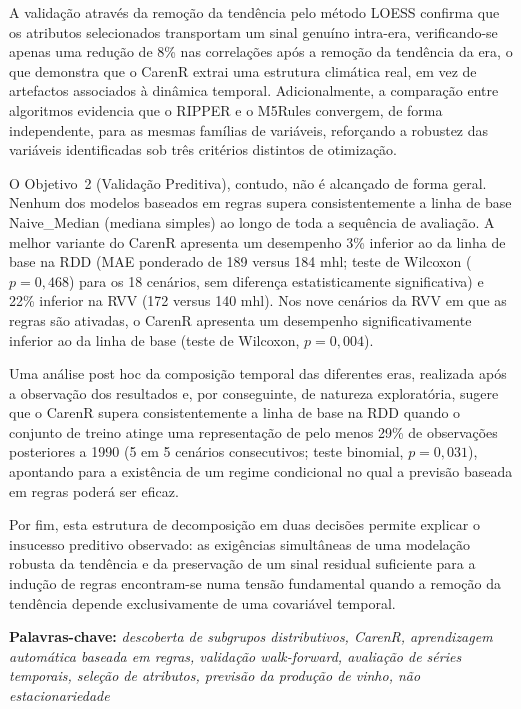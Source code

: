A validação através da remoção da tendência pelo método LOESS confirma que os atributos selecionados transportam um sinal genuíno intra-era, verificando-se apenas uma redução de 8\% nas correlações após a remoção da tendência da era, o que demonstra que o CarenR extrai uma estrutura climática real, em vez de artefactos associados à dinâmica temporal. Adicionalmente, a comparação entre algoritmos evidencia que o RIPPER e o M5Rules convergem, de forma independente, para as mesmas famílias de variáveis, reforçando a robustez das variáveis identificadas sob três critérios distintos de otimização.

O Objetivo~2 (Validação Preditiva), contudo, não é alcançado de forma geral. Nenhum dos modelos baseados em regras supera consistentemente a linha de base Naive\_Median (mediana simples) ao longo de toda a sequência de avaliação. A melhor variante do CarenR apresenta um desempenho 3\% inferior ao da linha de base na RDD (MAE ponderado de 189 versus 184 mhl; teste de Wilcoxon ($p = 0{,}468$) para os 18 cenários, sem diferença estatisticamente significativa) e 22\% inferior na RVV (172 versus 140 mhl). Nos nove cenários da RVV em que as regras são ativadas, o CarenR apresenta um desempenho significativamente inferior ao da linha de base (teste de Wilcoxon, $p = 0{,}004$).

Uma análise post hoc da composição temporal das diferentes eras, realizada após a observação dos resultados e, por conseguinte, de natureza exploratória, sugere que o CarenR supera consistentemente a linha de base na RDD quando o conjunto de treino atinge uma representação de pelo menos 29\% de observações posteriores a 1990 (5 em 5 cenários consecutivos; teste binomial, $p = 0{,}031$), apontando para a existência de um regime condicional no qual a previsão baseada em regras poderá ser eficaz.

Por fim, esta estrutura de decomposição em duas decisões permite explicar o insucesso preditivo observado: as exigências simultâneas de uma modelação robusta da tendência e da preservação de um sinal residual suficiente para a indução de regras encontram-se numa tensão fundamental quando a remoção da tendência depende exclusivamente de uma covariável temporal.

\textbf{Palavras-chave: }\textit{descoberta de subgrupos distributivos, CarenR, aprendizagem automática baseada em regras, validação walk-forward, avaliação de séries temporais, seleção de atributos, previsão da produção de vinho, não estacionariedade}
